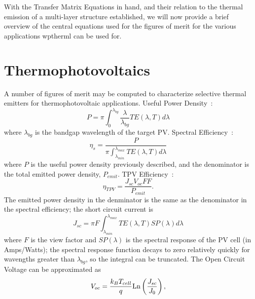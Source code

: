 \documentclass[journal=jpclcd,manuscript=suppinfo]{achemso}
\begin{document}
With the Transfer Matrix Equations in hand, and their relation to the thermal
emission of a multi-layer structure established, we will now provide a brief overview of the 
central equations used for the figures of merit for the various applications wptherml
can be used for.

\section{Thermophotovoltaics}
A number of figures of merit may be computed to characterize selective thermal emitters
for thermophotovoltaic applications.
\newline
Useful Power Density~\cite{JHR_AdvEnMat_2018}:
\begin{equation}
P = \pi \int_0^{\lambda_{bg}} \frac{\lambda}{\lambda_{bg}} TE(\lambda, T) d\lambda
\end{equation}
where $\lambda_{bg}$ is the bandgap wavelength of the target PV.
\newline
Spectral Efficiency~\cite{JHR_AdvEnMat_2018}:
\begin{equation}
\eta_s = \frac{P}{\pi \int_{\lambda_{min}}^{\lambda_{max}} TE(\lambda, T) d\lambda}
\end{equation}
where $P$ is the useful power density previously described, and the
denominator is the total emitted power density, $P_{emit}$.
\newline
TPV Efficiency~\cite{QHM_Solar_2005, RF_OptExp_2009,JHR_AdvEnMat_2018}:
\begin{equation}
\eta_{TPV} = \frac{ J_{sc} V_{oc} FF}{P_{emit}}.
\end{equation}
The emitted power density in the denminator is the same as the denominator
in the spectral efficiency;  
the short circuit current is~\cite{QHM_Solar_2005, RF_OptExp_2009,JHR_AdvEnMat_2018}
\begin{equation}
J_{sc} = \pi F \int_{\lambda_{min}}^{\lambda_{max}} TE(\lambda, T) SP(\lambda) d\lambda
\end{equation}
where $F$ is the view factor and $SP(\lambda)$ is the spectral response of the PV cell (in Amps/Watts);
the spectral response function decays to zero relatively quickly for wavengths greater than $\lambda_{bg}$, 
so the integral can be truncated. 
The Open Circuit Voltage can be approximated as~\cite{QHM_Solar_2005, JHR_AdvEnMat_2018}
\begin{equation}
V_{oc} = \frac{k_B T_{cell}}{q} {\rm Ln}\left(\frac{J_{sc}}{J_0}\right) ,
\end{equation}
\end{document}
